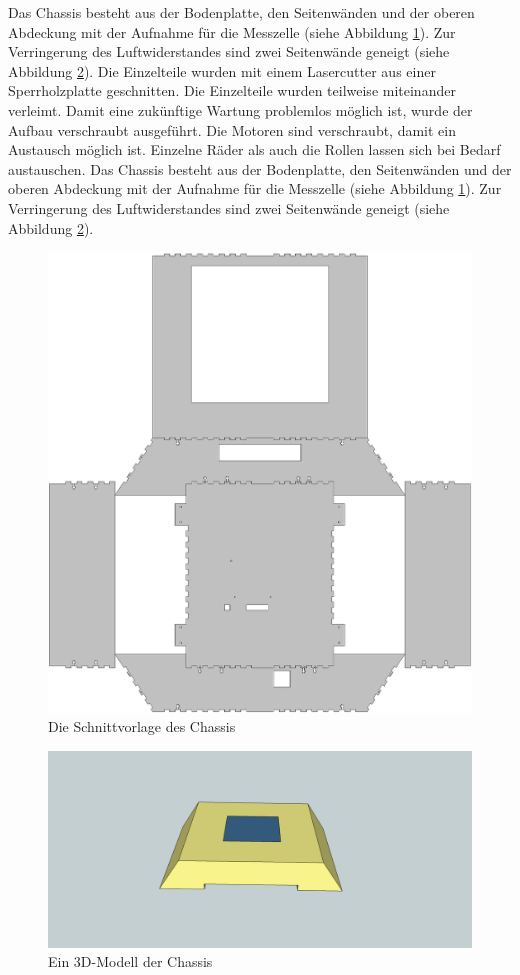 \documentclass[a4paper,bibtotoc,oneside]{scrbook}
\begin{document}
Das Chassis besteht aus der Bodenplatte, den Seitenwänden und der oberen Abdeckung mit der Aufnahme für die Messzelle (siehe Abbildung \ref{gehause}). Zur Verringerung des Luftwiderstandes sind zwei Seitenwände geneigt (siehe Abbildung \ref{robo3d}).  
\noindent Die Einzelteile wurden mit einem Lasercutter aus einer Sperrholzplatte geschnitten. Die Einzelteile wurden teilweise miteinander verleimt. Damit eine zukünftige Wartung problemlos möglich ist, wurde der Aufbau verschraubt ausgeführt.
Die Motoren sind verschraubt, damit ein Austausch möglich ist. Einzelne Räder als auch die Rollen lassen sich bei Bedarf austauschen. 
Das Chassis besteht aus der Bodenplatte, den Seitenwänden und der oberen Abdeckung mit der Aufnahme für die Messzelle (siehe Abbildung \ref{gehause}). Zur Verringerung des Luftwiderstandes sind zwei Seitenwände geneigt (siehe Abbildung \ref{robo3d}).  


\begin{figure}[htbp]
\centering
\includegraphics[width=125mm]{img/gehause3.png}
\caption[Chassis]{Die Schnittvorlage des Chassis}\label{gehause}
\end{figure}

\begin{figure}[htbp]
\centering
\includegraphics[width=125mm]{img/robo3d.png}
\caption[Chassis]{Ein 3D-Modell der Chassis}\label{robo3d}
\end{figure}
\end{document}
